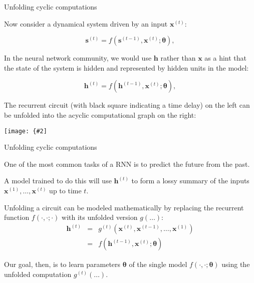 \documentclass{beamer}
\renewcommand{\vec}[1]{\boldsymbol{#1}}
\newcommand{\myfig}[3]{\centerline{\texttt{[image: \{\#2]}}}
    \centerline{\scriptsize #3}}
\begin{document}
\begin{frame}{Unfolding cyclic computations}

  Now consider a dynamical system driven by an input $\vec{x}^{(t)}$:

  \[ \vec{s}^{(t)} = f(\vec{s}^{(t-1)},\vec{x}^{(t)};\vec{\theta}), \] 

  In the neural network community, we would use $\vec{h}$ rather than
  $\vec{x}$ as a hint that the state of the system is \alert{hidden}
  and represented by hidden units in the model:
  
  \[ \vec{h}^{(t)} = f(\vec{h}^{(t-1)},\vec{x}^{(t)};\vec{\theta}), \] 

  The recurrent \alert{circuit} (with black square indicating a
  \alert{time delay}) on the left can be \alert{unfolded} into the
  \alert{acyclic computational graph} on the right:

  \medskip
  
  \myfig{3in}{goodfellow-fig10-02}{Goodfellow, Bengio, and Courville
    (2016), Fig.\ 10.2}
  
\end{frame}


\begin{frame}{Unfolding cyclic computations}

  One of the most common tasks of a RNN is to \alert{predict the future
    from the past}.

  \medskip

  A model trained to do this will use $\vec{h}^{(t)}$ to form a
  \alert{lossy summary} of the inputs $\vec{x}^{(1)}, \ldots, \vec{x}^{(t)}$
  up to time $t$.

  \medskip

  Unfolding a circuit can be modeled mathematically by replacing the
  recurrent function $f(\cdot,\cdot;\cdot)$ with its unfolded version
  $g(\ldots)$:
  \begin{eqnarray}
    \vec{h}^{(t)} & = & g^{(t)}(\vec{x}^{(t)},\vec{x}^{(t-1)},\ldots,\vec{x}^{(1)}) \nonumber \\
    & = & f(\vec{h}^{(t-1)},\vec{x}^{(t)};\vec{\theta}) \nonumber
  \end{eqnarray}

  \medskip

  Our goal, then, is to learn parameters $\vec{\theta}$ of the
  \alert{single model} $f(\cdot,\cdot;\vec{\theta})$ using the
  unfolded computation $g^{(t)}(\ldots)$.
  
\end{frame}
\end{document}
